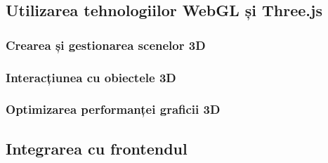 \subsection{Utilizarea tehnologiilor WebGL și Three.js}
\subsubsection{Crearea și gestionarea scenelor 3D}
\subsubsection{Interacțiunea cu obiectele 3D}
\subsubsection{Optimizarea performanței graficii 3D}
\subsection{Integrarea cu frontendul}







